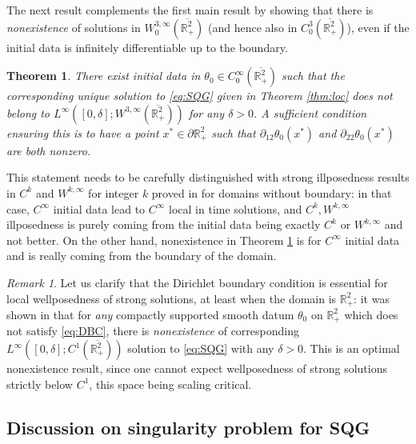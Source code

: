 \documentclass[10pt]{amsart}
\newtheorem{maintheorem}{Theorem}
\theoremstyle{definition}
\theoremstyle{remark}
\newtheorem{remark}[theorem]{Remark}
\numberwithin{equation}{section}
\newcommand{\rd}{\partial}
\newcommand{\0}{\emptyset}
\newcommand{\ohp}{\overline{\bbR^2_+}}
\newcommand{\dlt}{\delta}
\newcommand{\tht}{\theta}
\newcommand{\bbR}{\mathbb R}
\begin{document}
The next result complements the first main result by showing that there is \textit{nonexistence} of solutions in $W^{3,\infty}_{0}(\ohp)$ (and hence also in $C^{3}_{0}(\ohp)$), even if the initial data is infinitely differentiable up to the boundary. 
	\begin{maintheorem}\label{thm:nonexist}
		There exist initial data in $\tht_0 \in C^{\infty}_0(\overline{\bbR^2_+})$ such that the corresponding unique solution to \eqref{eq:SQG} given in Theorem \ref{thm:loc} does not belong to $L^\infty([0,\delta];W^{3,\infty}(\overline{\bbR^2_{+}}))$ for any $\delta>0$. A sufficient condition ensuring this is to have a point $x^* \in \partial\bbR^2_+$ such that $\rd_{12}\tht_{0}(x^*)$ and   $\rd_{22}\tht_{0}(x^*)$ are both nonzero. 
	\end{maintheorem}
	This statement needs to be carefully distinguished with strong illposedness results in $C^{k}$ and $W^{k,\infty}$ for integer $k$ proved in \cite{CoZo,KJ-SQG} for domains without boundary: in that case, $C^\infty$ initial data lead to $C^\infty$ local in time solutions, and $C^{k}, W^{k,\infty}$ illposedness is purely coming from the initial data being exactly $C^{k}$ or $W^{k,\infty}$ and not better. On the other hand, nonexistence in Theorem \ref{thm:nonexist} is for $C^\infty$ initial data and is really coming from the boundary of the domain. 
	
	
	
	
	
	\begin{remark}\label{rmk:DBC}
		Let us clarify that the Dirichlet boundary condition is essential for local wellposedness of strong solutions, at least when the domain is $\bbR^{2}_{+}$: it was shown in \cite{JKY} that for \textit{any} compactly supported smooth datum $\tht_{0}$ on $\bbR^{2}_{+}$ which does not satisfy \eqref{eq:DBC}, there is \textit{nonexistence} of corresponding $L^\infty([0,\dlt];C^1( \overline{\bbR^2_+} ))$ solution to \eqref{eq:SQG} with any $\dlt>0$. This is an optimal nonexistence result, since one cannot expect wellposedness of strong solutions strictly below $C^{1}$, this space being scaling critical.  
	\end{remark}
	
	
	\subsection{Discussion on singularity problem for SQG}
	
\end{document}
